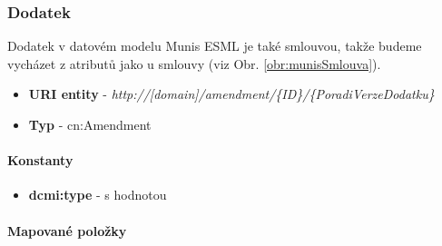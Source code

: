\subsubsection{Dodatek}

Dodatek v datovém modelu Munis ESML je také smlouvou, takže budeme vycházet z atributů jako u smlouvy (viz Obr. \ref{obr:munisSmlouva}).

\begin{itemize}
\item \textbf{URI entity} - \textit{http://[domain]/amendment/\{ID\}/\{PoradiVerzeDodatku\}}
\item \textbf{Typ} - cn:Amendment
\end{itemize}

\paragraph*{Konstanty}

\begin{itemize}
\item \textbf{dcmi:type} - s hodnotou 
\end{itemize}

\paragraph*{Mapované položky}

